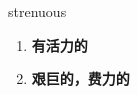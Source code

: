
\begin{frame}
{\huge strenuous}
\begin{center}
\begin{enumerate}\Large
  \item \textbf{有活力的}
  \item \textbf{艰巨的，费力的}
\end{enumerate}
\end{center}
\end{frame}

